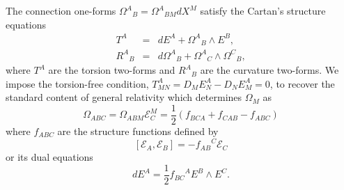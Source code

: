 \documentclass[12pt,epsf]{article}
\begin{document}
The connection one-forms ${\Omega^A}_B = {\Omega^A}_{B M} dX^M$ satisfy
the Cartan's structure equations \cite{egh-report,nakahara}
\begin{eqnarray} \label{steq-torsion}
  T^A &=& dE^A + {\Omega^A}_B \wedge E^B, \\
  \label{steq-curvature}
  {R^A}_B  &=& d {\Omega^A}_B + {\Omega^A}_C \wedge {\Omega^C}_B,
\end{eqnarray}
where $T^A$ are the torsion two-forms and ${R^A}_B$ are the curvature two-forms.
We impose the torsion-free condition, $T^A_{MN} = D_M E_N^A - D_N E_M^A =0$, to recover the standard content
of general relativity which determines $\Omega_M$ as
\begin{equation}\label{spin-torsion}
  \Omega_{ABC} = \Omega_{ABM} \mathcal{E}_C^M = \frac{1}{2} (f_{BCA} + f_{CAB} - f_{ABC})
\end{equation}
where $f_{ABC}$ are the structure functions defined by
\begin{equation}\label{str-vector}
  [\mathcal{E}_A, \mathcal{E}_B] = - {f_{AB}}^{C} \mathcal{E}_C
\end{equation}
or its dual equations
\begin{equation}\label{str-covector}
  dE^A = \frac{1}{2} {f_{BC}}^{A} E^B \wedge E^C.
\end{equation}
\end{document}
